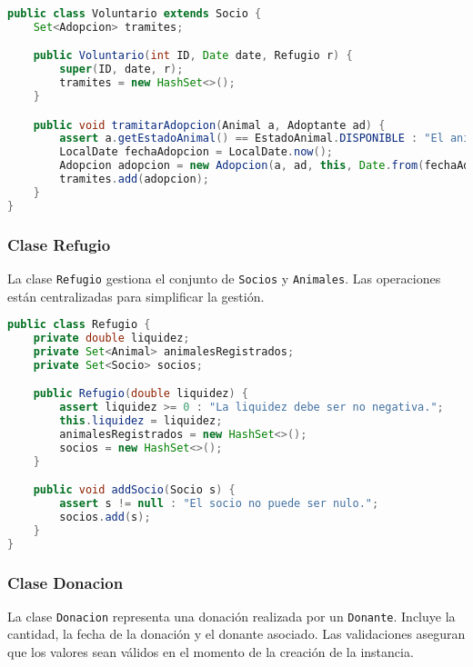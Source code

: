 \begin{lstlisting}[language=Java]
public class Voluntario extends Socio {
    Set<Adopcion> tramites;

    public Voluntario(int ID, Date date, Refugio r) {
        super(ID, date, r);
        tramites = new HashSet<>();
    }

    public void tramitarAdopcion(Animal a, Adoptante ad) {
        assert a.getEstadoAnimal() == EstadoAnimal.DISPONIBLE : "El animal ya esta adoptado.";
        LocalDate fechaAdopcion = LocalDate.now();
        Adopcion adopcion = new Adopcion(a, ad, this, Date.from(fechaAdopcion.atStartOfDay(ZoneId.systemDefault()).toInstant()));
        tramites.add(adopcion);
    }
}
\end{lstlisting}

\subsubsection{Clase Refugio}
La clase \texttt{Refugio} gestiona el conjunto de \texttt{Socios} y \texttt{Animales}. Las operaciones están centralizadas para simplificar la gestión.

\begin{lstlisting}[language=Java]
public class Refugio {
    private double liquidez;
    private Set<Animal> animalesRegistrados;
    private Set<Socio> socios;

    public Refugio(double liquidez) {
        assert liquidez >= 0 : "La liquidez debe ser no negativa.";
        this.liquidez = liquidez;
        animalesRegistrados = new HashSet<>();
        socios = new HashSet<>();
    }

    public void addSocio(Socio s) {
        assert s != null : "El socio no puede ser nulo.";
        socios.add(s);
    }
}
\end{lstlisting}

\subsubsection{Clase Donacion}
La clase \texttt{Donacion} representa una donación realizada por un \texttt{Donante}. Incluye la cantidad, la fecha de la donación y el donante asociado. Las validaciones aseguran que los valores sean válidos en el momento de la creación de la instancia.

